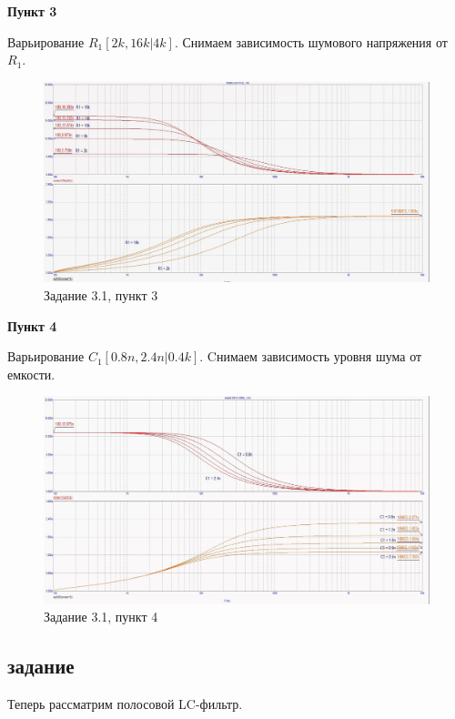 \documentclass[a4paper, 14pt]{extarticle}%
\begin{document}
\textbf{Пункт 3}
\newline

Варьирование $R_1[2k, 16k | 4k]$.
Снимаем зависимость шумового напряжения от $R_1$.

\begin{figure}[h!]
			\centering
			\includegraphics[width=1.1\linewidth]{3/3_1_4.jpg}
			\caption{Задание 3.1, пункт 3}
			\label{A}
\end{figure}


\textbf{Пункт 4}
\newline

Варьирование $C_1[0.8n, 2.4n | 0.4k]$.
Cнимаем зависимость уровня шума от емкости.

\begin{figure}[h!]
			\centering
			\includegraphics[width=1.1\linewidth]{3/3_1_3.jpg}
			\caption{Задание 3.1, пункт 4}
			\label{A}
\end{figure}

\subsection{задание}

Теперь рассматрим полосовой LC-фильтр.
\end{document}
